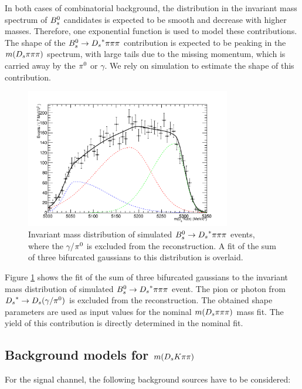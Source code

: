 In both cases of combinatorial background, the distribution in the invariant mass spectrum of ${{B}^0_{s}}$ candidates is expected to be smooth and decrease with higher masses. 
Therefore, one exponential function is used to model these contributions. \newline
The shape of the  ${{B}^0_{s}}\rightarrow{\ensuremath{{D}_{s}}}^{*}{\pi}{\pi}{\pi}$ contribution is expected to be peaking in the $m({{D}_{s}}{\pi}{\pi}{\pi})$ spectrum, with large tails due to the missing momentum, which is carried away by the ${{\pi}^0}$ or $\gamma$. 
We rely on simulation to estimate the shape of this contribution. 

\begin{figure}[h]
\includegraphics[height=8.cm,width=0.80\textwidth]{figs/Bs2Dsstartpipipi.pdf}
\caption{Invariant mass distribution of simulated ${{B}^0_{s}}\rightarrow{\ensuremath{{D}_{s}}}^{*}{\pi}{\pi}{\pi}$ events, where the $\gamma$/${{\pi}^0}$ is excluded from the reconstruction. 
A fit of the sum of three bifurcated gaussians to this distribution is overlaid.}
\label{fig: BsDsstar3piMC}
\end{figure}

Figure \ref{fig: BsDsstar3piMC} shows the fit of the sum of three bifurcated gaussians to the invariant mass distribution of simulated ${{B}^0_{s}}\rightarrow{\ensuremath{{D}_{s}}}^{*}{\pi}{\pi}{\pi}$ event. 
The pion or photon from ${{D}_{s}}^{*}\rightarrow{\ensuremath{{D}_{s}}}(\gamma/{{\pi}^0})$ is excluded from the reconstruction. The obtained shape parameters are used as input values for the nominal $m({{D}_{s}}{\pi}{\pi}{\pi})$ mass fit. 
The yield of this contribution is directly determined in the nominal fit. 


\subsection{Background models for $m({{D}_{s}}{K}{\pi}{\pi})$}
For the signal channel, the following background sources have to be considered:

